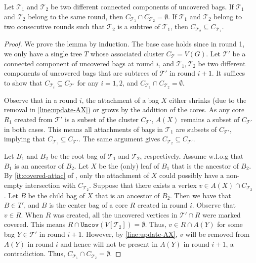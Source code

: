 \documentclass{theoretics}
\newcommand{\mt}{\mathcal{T}}
\def\uncovset{\mathtt{Uncov}}
\def\core{R}
\begin{document}
\begin{lemma}\label{lm:hierarchy} Let $\mt_1$ and $\mt_2$ be two different connected components of uncovered bags. If $\mt_1$ and $\mt_2$  belong to the same round, then  $C_{\mt_1}\cap C_{\mt_2} = \emptyset$. If $\mt_1$ and $\mt_2$ belong to two consecutive rounds such that $\mt_2$ is a subtree of $\mt_1$, then $C_{\mt_2}\subseteq C_{\mt_1}$. 
\end{lemma}
\begin{proof}
	We prove the lemma by induction. The base case holds since in round 1, we only have a single tree $T$ whose associated cluster $C_{\mathcal{T}} = V(G)$.  Let $\mt'$ be a connected component of uncovered bags at round $i$, and $\mt_1,\mt_2$ be two different components of uncovered bags that are subtrees of $\mt'$ in round $i+1$.  It suffices to show that $C_{\mt_i}\subseteq C_{\mt'}$ for any $i = 1,2$, and $C_{\mt_1}\cap C_{\mt_2} = \emptyset$.
	
	Observe that in a round $i$, the attachment of a bag $X$ either shrinks (due to the removal in \cref{line:update-AX}) or grows by the addition of the cores. As any core  $\core_1$ created from $\mt'$ is a subset of the cluster $C_{\mt'}$, $A(X)$ remains a subset of  $C_{\mt'}$ in both cases. This means all attachments of bags in $\mt_1$ are subsets of $C_{\mt'}$, implying that $C_{\mt_1}\subseteq C_{\mt'}$. The same argument gives  $C_{\mt_2}\subseteq C_{\mt'}$.
	
	Let $B_1$ and $B_2$ be the root bag of $\mt_1$ and $\mt_2$, respectively. Assume w.l.o.g that $B_1$ is an ancestor of $B_2$. Let $X$ be the (only) leaf of $B_1$ that is the ancestor of $B_2$.  By \cref{it:covered-attac} of , only the attachment of $X$ could possibly have a non-empty intersection with $C_{\mt_2}$. Suppose that there exists a vertex $v\in A(X)\cap C_{\mt_2}$. Let $B$ be the child bag of $X$ that is an ancestor of $B_2$. Then we have that $B \in T'$, and $B$ is the center bag of a core $R$ created in round $i$. Observe that $v\in \core$. When $\core$ was created, all the uncovered vertices in $\mt' \cap \core$ were marked covered. This means $\core\cap \uncovset(V[\mt_2]) = \emptyset$. Thus,  $v\in \core \cap A(Y)$ for some bag $Y\in \mt'$ in round $i+1$. However, by \cref{line:update-AX}, $v$ will be removed from $A(Y)$ in round $i$ and hence will not be present in $A(Y)$ in round $i+1$, a contradiction. Thus,   $C_{\mt_1}\cap C_{\mt_2} = \emptyset$.
\end{proof}
\end{document}
